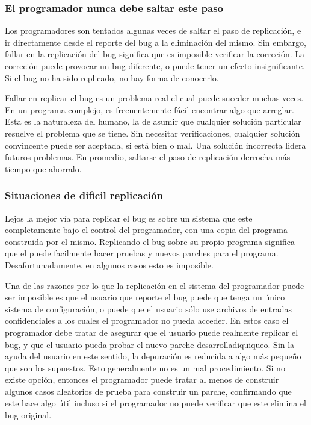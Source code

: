 \documentclass[12pt,a4paper]{report}
\begin{document}
\subsubsection{El programador nunca debe saltar este paso}


Los programadores son tentados algunas veces  de saltar el paso de replicación, e ir directamente desde el reporte del bug a la eliminación del mismo.  Sin embargo, fallar en la replicación del bug significa que es imposible verificar la correción.  La correción puede provocar un bug diferente, o puede tener un efecto insignificante.  Si el bug no ha sido replicado, no hay forma de conocerlo.

Fallar en replicar el bug es un problema real el cual puede suceder muchas veces.  En un programa complejo, es frecuentemente fácil encontrar algo que arreglar.  Esta es la naturaleza del humano, la de asumir que cualquier solución particular resuelve el problema que se tiene.  Sin necesitar verificaciones, cualquier solución convincente puede ser aceptada, si está bien o mal.  Una solución incorrecta lidera futuros problemas.  En promedio, saltarse el paso de replicación derrocha más tiempo que ahorralo.


\subsubsection{Situaciones de dificil replicación}

Lejos la mejor vía para replicar el bug es sobre un sistema que este completamente bajo el control del programador, con una copia del programa construida por el mismo.  Replicando el bug sobre su propio programa significa que el puede facilmente hacer pruebas y nuevos parches para el programa.  Desafortunadamente, en algunos casos esto es imposible.

Una de las razones por lo que la replicación en el sistema del programador puede ser imposible es que el usuario que reporte el bug puede que tenga un único sistema de configuración, o puede que el usuario sólo use archivos de entradas confidenciales a los cuales el programador no pueda acceder.  En estos caso el programador debe tratar de asegurar que el usuario puede realmente replicar el bug, y que el usuario pueda probar el nuevo parche desarrolladiquiqueo.  Sin la ayuda del usuario en este sentido, la depuración es reducida a algo más pequeño que son los supuestos.  Esto generalmente no es un mal procedimiento.  Si no existe opción, entonces el programador puede tratar al menos de construir algunos casos aleatorios de prueba para construir un parche, confirmando que este hace algo útil incluso si el programador no puede verificar que este elimina el bug original.
\end{document}
